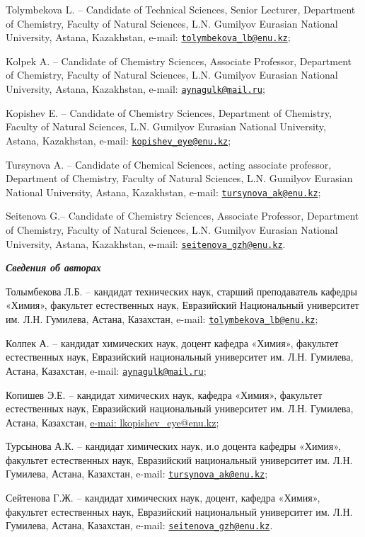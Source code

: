 Tolymbekova L. -- Candidate of Technical Sciences, Senior Lecturer,
Department of Chemistry, Faculty of Natural Sciences, L.N. Gumilyov
Eurasian National University, Astana, Kazakhstan, e-mail:
\href{mailto:tolymbekova_lb@enu.kz}{\nolinkurl{tolymbekova\_lb@enu.kz}};

Kolpek A. -- Candidate of Chemistry Sciences, Associate Professor,
Department of Chemistry, Faculty of Natural Sciences, L.N. Gumilyov
Eurasian National University, Astana, Kazakhstan, e-mail:
\href{mailto:aynagulk@mail.ru}{\nolinkurl{aynagulk@mail.ru}};

Kopishev E. -- Candidate of Chemistry Sciences, Department of Chemistry,
Faculty of Natural Sciences, L.N. Gumilyov Eurasian National University,
Astana, Kazakhstan, e-mail:
\href{mailto:kopishev_eye@enu.kz}{\nolinkurl{kopishev\_eye@enu.kz}};

Tursynova A. -- Сandidate of Chemical Sciences, acting associate
professor, Department of Chemistry, Faculty of Natural Sciences, L.N.
Gumilyov Eurasian National University, Astana, Kazakhstan, e-mail:
\href{mailto:tursynova_ak@enu.kz}{\nolinkurl{tursynova\_ak@enu.kz}};

Seitenova G.-- Candidate of Chemistry Sciences, Associate Professor,
Department of Chemistry, Faculty of Natural Sciences, L.N. Gumilyov
Eurasian National University, Astana, Kazakhstan, e-mail:
\href{mailto:seitenova_gzh@enu.kz}{\nolinkurl{seitenova\_gzh@enu.kz}}.

\emph{{\bfseries Сведения об авторах}}

Толымбекова Л.Б. -- кандидат технических наук, старший преподаватель
кафедры «Химия», факультет естественных наук, Евразийский Национальный
университет им. Л.Н. Гумилева, Астана, Казахстан, e-mail:
\href{mailto:tolymbekova_lb@enu.kz}{\nolinkurl{tolymbekova\_lb@enu.kz}};

Колпек А. -- кандидат химических наук, доцент кафедра «Химия», факультет
естественных наук, Евразийский национальный университет им. Л.Н.
Гумилева, Астана, Казахстан, e-mail:
\href{mailto:aynagulk@mail.ru}{\nolinkurl{aynagulk@mail.ru}};

Копишев Э.Е. -- кандидат химических наук, кафедра «Химия», факультет
естественных наук, Евразийский национальный университет им. Л.Н.
Гумилева, Астана, Казахстан,
\href{mailto:e-mai:\%20lkopishev_eye@enu.kz}{e-mai:
lkopishev\_eye@enu.kz};

Турсынова А.К. -- кандидат химических наук, и.о доцента кафедры «Химия»,
факультет естественных наук, Евразийский национальный университет им.
Л.Н. Гумилева, Астана, Казахстан, e-mail:
\href{mailto:tursynova_ak@enu.kz}{\nolinkurl{tursynova\_ak@enu.kz}};

Сейтенова Г.Ж. -- кандидат химических наук, доцент, кафедра «Химия»,
факультет естественных наук, Евразийский национальный университет им.
Л.Н. Гумилева, Астана, Казахстан, e-mail:
\href{mailto:seitenova_gzh@enu.kz}{\nolinkurl{seitenova\_gzh@enu.kz}}.